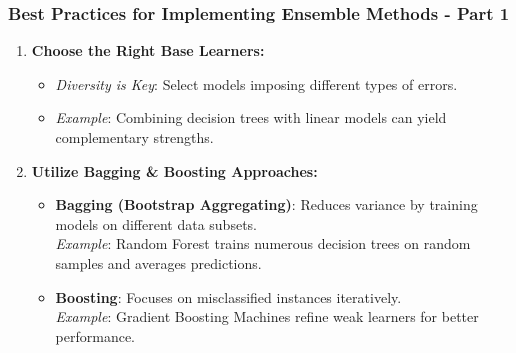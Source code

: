 \documentclass[aspectratio=169]{beamer}
\begin{document}
\begin{frame}
    \frametitle{Best Practices for Implementing Ensemble Methods - Part 1}
    \begin{enumerate}
        \item \textbf{Choose the Right Base Learners:}
            \begin{itemize}
                \item \textit{Diversity is Key}: Select models imposing different types of errors. 
                \item \textit{Example}: Combining decision trees with linear models can yield complementary strengths.
            \end{itemize}
        
        \item \textbf{Utilize Bagging \& Boosting Approaches:}
            \begin{itemize}
                \item \textbf{Bagging (Bootstrap Aggregating)}: Reduces variance by training models on different data subsets. \\
                    \textit{Example}: Random Forest trains numerous decision trees on random samples and averages predictions.
                
                \item \textbf{Boosting}: Focuses on misclassified instances iteratively. \\
                    \textit{Example}: Gradient Boosting Machines refine weak learners for better performance.
            \end{itemize}
    \end{enumerate}
\end{frame}
\end{document}
